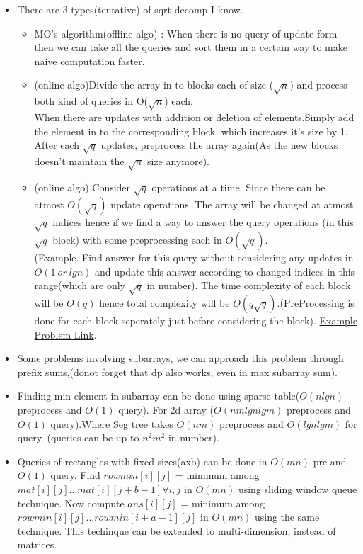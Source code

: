 \documentclass[../Notes.tex]{subfiles}
\begin{document}
\begin{itemize}
	\item There are 3 types(tentative) of sqrt decomp I know.
	\begin{itemize}
		\item MO's algorithm(offline algo) : When there is no query of update form then we can take all the queries and sort them in a certain way to make naive computation faster.
		\item (online algo)Divide the array in to blocks each of size ($\sqrt{n}$) and process both kind of queries in O($\sqrt{n}$) each.\\
		When there are updates with addition or deletion of elements.Simply add the element in to the corresponding block, which increases it's size by 1. After each $\sqrt{q}$ updates, preprocess the array again(As the new blocks doesn't maintain the $\sqrt{n}$ size anymore).
		\item (online algo) Consider $\sqrt{q}$ operations at a time. Since there can be atmost $O(\sqrt{q})$ update operations. The array will be changed at atmost $\sqrt{q}$ indices hence if we find a way to answer the query operations (in this $\sqrt{q}$ block) with some preprocessing each in $O(\sqrt{q})$.\\
		 (Example. Find answer for this query without considering any updates in $O(1 \: or \: lgn)$ and update this answer according to changed indices in this range(which are only $\sqrt{q}$ in number). The time complexity of each block will be $O(q)$ hence total complexity will be $O(q\sqrt{q})$.(PreProcessing is done for each block seperately just before considering the block). \href{https://codeforces.com/problemset/problem/785/E}{Example Problem Link}.
	\end{itemize}
	\item Some problems involving subarrays, we can approach this problem through prefix sums,(donot forget that dp also works, even in max subarray sum). 
	\item Finding min element in subarray can be done using sparse table($O(nlgn)$ preprocess and $O(1)$ query). For 2d array ($O(nmlgnlgm)$ preprocess and $O(1)$ query).Where Seg tree takes $O(nm)$ preprocess and $O(lgnlgm)$ for query. (queries can be up to $n^2m^2$ in number).
	\item Queries of rectangles with fixed sizes(axb) can be done in $O(mn)$ pre and $O(1)$ query. Find $rowmin[i][j]$ = minimum among $mat[i][j]\ldots mat[i][j+b-1] \forall i,j$ in $O(mn)$ using sliding window queue technique. Now compute $ans[i][j]$ = minimum among $rowmin[i][j]\ldots rowmin[i+a-1][j]$ in $O(mn)$ using the same technique. This techinque can be extended to multi-dimension, instead of matrices.
\end{itemize}
\end{document}
